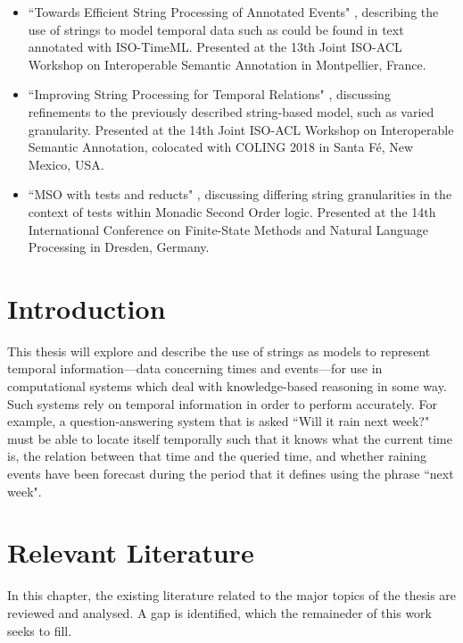 \documentclass[a4paper,12pt,leqno]{article}
\begin{document}
\begin{itemize}
	\item ``Towards Efficient String Processing of Annotated Events" \citep{woods2017towards}, describing the use of strings to model temporal data such as could be found in text annotated with ISO-TimeML. Presented at the 13th Joint ISO-ACL Workshop on Interoperable Semantic Annotation in Montpellier, France.
	\item ``Improving String Processing for Temporal Relations" \citep{woods2018improving}, discussing refinements to the previously described string-based model, such as varied granularity. Presented at the 14th Joint ISO-ACL Workshop on Interoperable Semantic Annotation, colocated with COLING 2018 in Santa F\'{e}, New Mexico, USA.
	\item ``MSO with tests and reducts" \citep*{fernando2019mso}, discussing differing string granularities in the context of tests within Monadic Second Order logic. Presented at the 14th International Conference on Finite-State Methods and Natural Language Processing in Dresden, Germany.
\end{itemize}
\newpage
\tableofcontents
\newpage
{}
\section{Introduction}\label{sec:intro}
This thesis will explore and describe the use of strings as models to represent temporal information---data concerning times and events---for use in computational systems which deal with knowledge-based reasoning in some way. Such systems rely on temporal information in order to perform accurately. For example, a question-answering system that is asked ``Will it rain next week?" must be able to locate itself temporally such that it knows what the current time is, the relation between that time and the queried time, and whether raining events have been forecast during the period that it defines using the phrase ``next week".
\newpage
\section{Relevant Literature}\label{sec:litreview}
In this chapter, the existing literature related to the major topics of the thesis are reviewed and analysed. A gap is identified, which the remaineder of this work seeks to fill.
\end{document}

